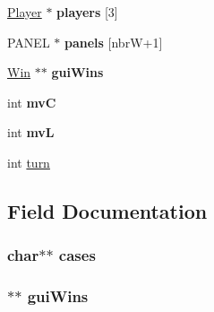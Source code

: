 \begin{DoxyCompactItemize}
\item 
\hyperlink{struct_player}{Player} $\ast$ {\bfseries players} \mbox{[}3\mbox{]}\hypertarget{struct___map_a48395d86670996c0e7144aff32feb7be}{}\label{struct___map_a48395d86670996c0e7144aff32feb7be}

\item 
P\+A\+N\+EL $\ast$ {\bfseries panels} \mbox{[}nbrW+1\mbox{]}\hypertarget{struct___map_acf9de252f49470dbdbd63ede514eb4eb}{}\label{struct___map_acf9de252f49470dbdbd63ede514eb4eb}

\item 
\hyperlink{struct_win}{Win} $\ast$$\ast$ {\bfseries gui\+Wins}\hypertarget{struct___map_a81c46208e94d18eaf33350342c9051f1}{}\label{struct___map_a81c46208e94d18eaf33350342c9051f1}

\item 
int {\bfseries mvC}\hypertarget{struct___map_a23569f3884fe223e40739ce644769816}{}\label{struct___map_a23569f3884fe223e40739ce644769816}

\item 
int {\bfseries mvL}\hypertarget{struct___map_a610a529d29e0a116ba9b47eacecbb962}{}\label{struct___map_a610a529d29e0a116ba9b47eacecbb962}

\item 
int \hyperlink{struct___map_aaefa47f4fdf865c2358c22b542a993e4}{turn}
\end{DoxyCompactItemize}


\subsection{Field Documentation}
\subsubsection[{\texorpdfstring{cases}{cases}}]{\setlength{\rightskip}{0pt plus 5cm}char$\ast$$\ast$ cases}\hypertarget{struct___map_a601e32b61d466f9df86e0fbc527472bf}{}\label{struct___map_a601e32b61d466f9df86e0fbc527472bf}
\subsubsection[{\texorpdfstring{gui\+Wins}{guiWins}}]{$\ast$$\ast$ gui\+Wins}\hypertarget{struct___map_a81c46208e94d18eaf33350342c9051f1}{}\label{struct___map_a81c46208e94d18eaf33350342c9051f1}
